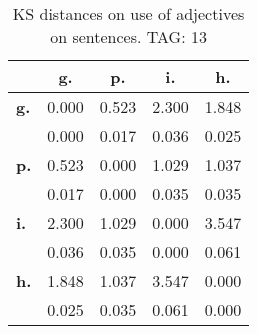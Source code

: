 \begin{table}[h!]
\begin{center}
\begin{tabular}{| l || c | c | c | c |}\hline
 & {\bf g.} & {\bf p.} & {\bf i.} & {\bf h.} \\\hline\hline
{\bf g.} & 0.000 & 0.523 & 2.300 & 1.848 \\
{\bf } & 0.000 & 0.017 & 0.036 & 0.025 \\\hline
{\bf p.} & 0.523 & 0.000 & 1.029 & 1.037 \\
{\bf } & 0.017 & 0.000 & 0.035 & 0.035 \\\hline
{\bf i.} & 2.300 & 1.029 & 0.000 & 3.547 \\
{\bf } & 0.036 & 0.035 & 0.000 & 0.061 \\\hline
{\bf h.} & 1.848 & 1.037 & 3.547 & 0.000 \\
{\bf } & 0.025 & 0.035 & 0.061 & 0.000 \\\hline
\end{tabular}
\caption{KS distances on use of adjectives on sentences. TAG: 13}
\end{center}
\end{table}